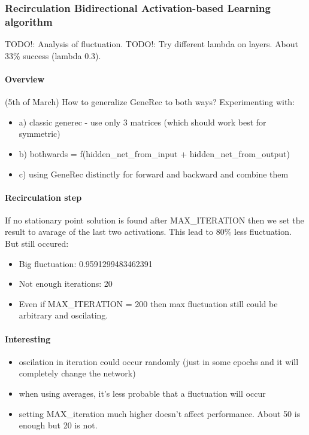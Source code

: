
\subsubsection{Recirculation Bidirectional Activation-based Learning algorithm} 
TODO!: Analysis of fluctuation. 
TODO!: Try different lambda on layers. 
About 33\% success (lambda 0.3). 

\paragraph{Overview} 
(5th of March) 
How to generalize GeneRec to both ways? 
Experimenting with:
\begin{itemize} 
\item  a) classic generec - use only 3 matrices (which should work best for symmetric) 
\item  b) bothwards = f(hidden\_net\_from\_input + hidden\_net\_from\_output) 
\item  c) using GeneRec distinctly for forward and backward and combine them 
\end{itemize} 

\paragraph{Recirculation step} 
If no stationary point solution is found after MAX\_ITERATION then we set the result to avarage of the last two activations. This lead to 80\% less fluctuation. But still occured: 
\begin{itemize}
\item Big fluctuation: 0.9591299483462391
\item Not enough iterations: 20
\item Even if MAX\_ITERATION = 200 then max fluctuation still could be arbitrary and oscilating.
\end{itemize} 

\paragraph{Interesting} 
\begin{itemize} 
  \item oscilation in iteration could occur randomly (just in some epochs and it will completely change the network) 
  \item when using averages, it's less probable that a fluctuation will occur 
  \item setting MAX\_iteration much higher doesn't affect performance. About 50 is enough but 20 is not. 
\end{itemize} 
  

